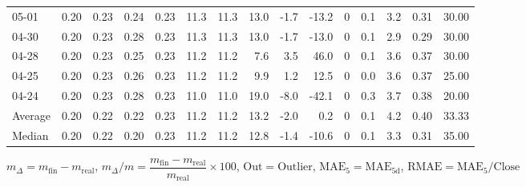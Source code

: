\begin{threeparttable}
{\begin{tabular}{lrrrrrrrrrrrrrr}
  05-01 &          0.20 &          0.23 &          0.24 &        0.23 &                11.3 &               11.3 &                13.0 &       -1.7 &        -13.2 &              0 &                 0.1 &              3.2 &            0.31 &                  30.00 \\
  04-30 &          0.20 &          0.23 &          0.28 &        0.23 &                11.3 &               11.3 &                13.0 &       -1.7 &        -13.0 &              0 &                 0.1 &              2.9 &            0.29 &                  30.00 \\
  04-28 &          0.20 &          0.23 &          0.25 &        0.23 &                11.2 &               11.2 &                 7.6 &        3.5 &         46.0 &              0 &                 0.1 &              3.6 &            0.37 &                  30.00 \\
  04-25 &          0.20 &          0.23 &          0.26 &        0.23 &                11.2 &               11.2 &                 9.9 &        1.2 &         12.5 &              0 &                 0.0 &              3.6 &            0.37 &                  25.00 \\
  04-24 &          0.20 &          0.23 &          0.28 &        0.23 &                11.0 &               11.0 &                19.0 &       -8.0 &        -42.1 &              0 &                 0.3 &              3.7 &            0.38 &                  20.00 \\
Average &          0.20 &          0.22 &          0.22 &        0.23 &                11.2 &               11.2 &                13.2 &       -2.0 &          0.2 &              0 &                 0.1 &              4.2 &            0.40 &                  33.33 \\
 Median &          0.20 &          0.22 &          0.20 &        0.23 &                11.2 &               11.2 &                12.8 &       -1.4 &        -10.6 &              0 &                 0.1 &              3.3 &            0.31 &                  35.00 \\
\bottomrule
\end{tabular}
}
\begin{tablenotes}\footnotesize
\item $m_\Delta=m_{\text{fin}}-m_{\text{real}}$,
$m_\Delta/m=\dfrac{m_{\text{fin}}-m_{\text{real}}}{m_{\text{real}}}\times100$,
$\mathrm{Out}=\text{Outlier}$,
$\mathrm{MAE}_5=\mathrm{MAE}_{5\text{d}}$,
$\mathrm{RMAE}=\mathrm{MAE}_5/\text{Close}$
\end{tablenotes}
\end{threeparttable}
\endgroup

